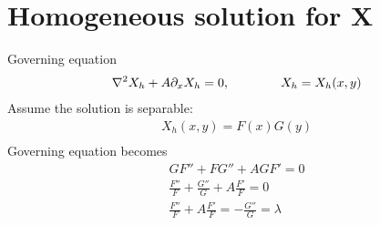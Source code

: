 \documentclass[11pt]{article}
\begin{document}
\section{Homogeneous solution for X}
Governing equation
\begin{equation}\begin{aligned}
\nabla^2 X_h + A \partial_x X_h = 0, \qquad\qquad X_h = X_h(x,y) \\
\end{aligned} \end{equation}
Assume the solution is separable:
\begin{equation}\begin{aligned}
X_h(x,y) = F(x)G(y) \\
\end{aligned} \end{equation}
Governing equation becomes
\begin{equation}\begin{aligned}
G F'' + FG'' + A G F' = 0 \\
 \frac{F''}{F} + \frac{G''}{G} + A \frac{F'}{F} = 0 \\
 \frac{F''}{F} + A \frac{F'}{F} = - \frac{G''}{G} = \lambda \\
\end{aligned} \end{equation}
\end{document}
